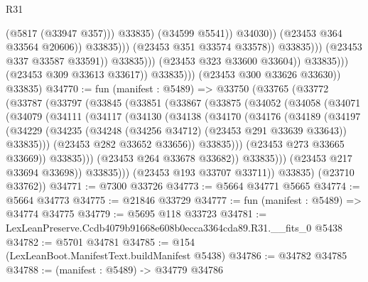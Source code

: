 \begin{lexlean}{R31}
\begin{coremodule}
                                                          (@5817 (@33947 @357)))
                                                        @33835)
                                                      (@34599 @5541))
                                                    @34030))
                                                (@23453 @364 @33564 @20606))
                                              @33835)))
                                        (@23453 @351 @33574 @33578))
                                      @33835)))
                                (@23453 @337 @33587 @33591))
                              @33835)))
                        (@23453 @323 @33600 @33604))
                      @33835)))
                (@23453 @309 @33613 @33617))
              @33835)))
        (@23453 @300 @33626 @33630))
      @33835)
@34770 := fun (manifest : @5489) =>
  @33750
    (@33765
      (@33772
        (@33787
          (@33797
            (@33845
              (@33851
                (@33867
                  (@33875
                    (@34052
                      (@34058
                        (@34071
                          (@34079
                            (@34111
                              (@34117
                                (@34130
                                  (@34138
                                    (@34170
                                      (@34176
                                        (@34189
                                          (@34197
                                            (@34229
                                              (@34235
                                                (@34248 (@34256 @34712) (@23453 @291 @33639 @33643))
                                                @33835)))
                                          (@23453 @282 @33652 @33656))
                                        @33835)))
                                  (@23453 @273 @33665 @33669))
                                @33835)))
                          (@23453 @264 @33678 @33682))
                        @33835)))
                  (@23453 @217 @33694 @33698))
                @33835)))
          (@23453 @193 @33707 @33711))
        @33835)
      (@23710 @33762))
@34771 := @7300 @33726
@34773 := @5664 @34771 @5665
@34774 := @5664 @34773
@34775 := @21846 @33729
@34777 := fun (manifest : @5489) => @34774 @34775
@34779 := @5695 @118 @33723
@34781 := LexLeanPreserve.Ccdb4079b91668e608b0ecca3364cda89.R31.__fits_0 @5438
@34782 := @5701 @34781
@34785 := @154 (LexLeanBoot.ManifestText.buildManifest @5438)
@34786 := @34782 @34785
@34788 := (manifest : @5489) -> @34779 @34786

\end{coremodule}
\end{lexlean}
